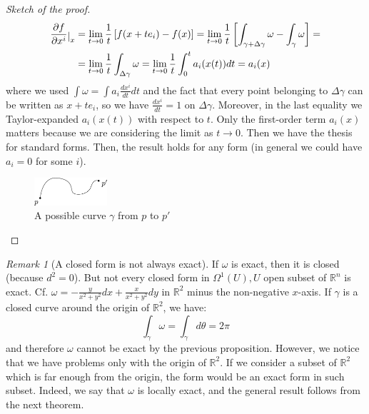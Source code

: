 \documentclass[a4paper,11pt,titlepage, article, oneside]{memoir}
\numberwithin{equation}{section}
\theoremstyle{definition}
\theoremstyle{remark}
\newtheorem{remark}[theorem]{Remark}
\newcommand{\rfield}{\mathbb{R}}
\newcommand{\restrict}[2]{{#1}\raisebox{-.5ex}{$|$}_{#2}}
\begin{document}
\begin{proof}[Sketch of the proof]
\begin{align*}
\restrict{\frac{\partial f}{\partial x^i}}{x} &= \lim\limits_{t \to 0} \frac{1}{t} \left[ f(x+t e_i) - f(x) \right] = \lim\limits_{t \to 0} \frac{1}{t} \left[  \int_{\gamma + \Delta \gamma} \omega - \int_{\gamma} \omega \right] = \\
&= \lim\limits_{t \to 0} \frac{1}{t} \int_{\Delta \gamma} \omega = \lim\limits_{t \to 0} \frac{1}{t} \int_0^t a_i(x(t)) dt = a_i(x)
\end{align*}
where we used $\int \omega = \int a_i \frac{dx^i}{dt} dt$ and the fact that every point belonging to $\Delta \gamma$ can be written as $x + t e_i$, so we have $\frac{dx^i}{dt} = 1$ on $\Delta \gamma$. Moreover, in the last equality we Taylor-expanded $a_i(x(t))$ with respect to $t$. Only the first-order term $a_i(x)$ matters because we are considering the limit as $t \to 0$. Then we have the thesis for standard forms. Then, the result holds for any form (in general we could have $a_i = 0$ for some $i$).
\begin{figure}[H] \label{Fig:pcurve}
     \centering
     \includegraphics[width=0.24\textwidth]{Images/pp'.pdf}
     \caption{A possible curve $\gamma$ from $p$ to $p'$} \qedhere
\end{figure} 
\end{proof}

\begin{remarkbox}\begin{remark}[A closed form is not always exact]
  If $\omega$ is exact, then it is closed (because $d^2=0$). But not every closed form in $\Omega^1(U), U$ open subset of $\rfield^n$ is exact. Cf. $\omega = - \frac{y}{x^2 + y^2} dx + \frac{x}{x^2+y^2}dy$ in $\rfield^2$ minus the non-negative $x$-axis. If $\gamma$ is a closed curve around the origin of $\rfield^2$, we have:
  $$\int_{\gamma} \omega = \int_{\gamma} d\theta = 2\pi$$
  and therefore $\omega$ cannot be exact by the previous proposition. However, we notice that we have problems only with the origin of $\rfield^2$. If we consider a subset of $\rfield^2$ which is far enough from the origin, the form would be an exact form in such subset. Indeed, we say that $\omega$ is locally exact, and the general result follows from the next theorem.
\end{remark}\end{remarkbox}
\end{document}
